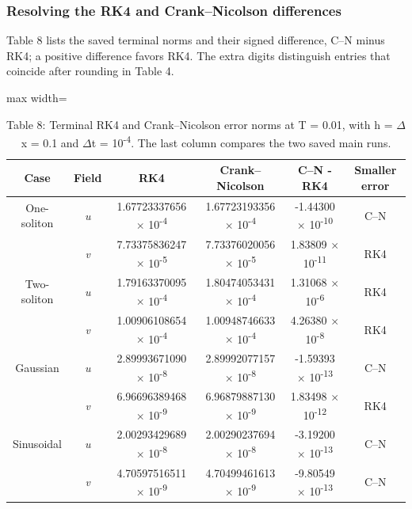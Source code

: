 \documentclass{article}
\theoremstyle{plain}
\theoremstyle{definition}
\begin{document}
\subsubsection*{Resolving the RK4 and Crank–Nicolson differences}

Table 8 lists the saved terminal norms and their signed difference, C–N minus RK4; a positive difference favors RK4. The extra digits distinguish entries that coincide after rounding in Table 4.

\begin{table}[H]
\centering
\caption*{Table 8: Terminal RK4 and Crank–Nicolson error norms at T = 0.01, with h = \(\Delta\)x = 0.1 and \(\Delta\)t = 10\textsuperscript{-}\textsuperscript{4}. The last column compares the two saved main runs.}
\normalsize
\setlength{\tabcolsep}{6pt}
\renewcommand{\arraystretch}{1.25}\setlength{\extrarowheight}{1pt}
\begin{adjustbox}{max width=\linewidth}
\begin{tabular}{cccccc}
\hline
\multicolumn{1}{c}{Case} & \multicolumn{1}{c}{Field} & \multicolumn{1}{c}{RK4} & \multicolumn{1}{c}{Crank–Nicolson} & \multicolumn{1}{c}{C–N - RK4} & \multicolumn{1}{c}{Smaller error} \\
\hline
One-soliton & \textit{u} & 1.67723337656 \(\times\) 10\textsuperscript{-4} & 1.67723193356 \(\times\) 10\textsuperscript{-4} & -1.44300 \(\times\) 10\textsuperscript{-10} & C–N \\
 & \textit{v} & 7.73375836247 \(\times\) 10\textsuperscript{-5} & 7.73376020056 \(\times\) 10\textsuperscript{-5} & 1.83809 \(\times\) 10\textsuperscript{-11} & RK4 \\
Two-soliton & \textit{u} & 1.79163370095 \(\times\) 10\textsuperscript{-4} & 1.80474053431 \(\times\) 10\textsuperscript{-4} & 1.31068 \(\times\) 10\textsuperscript{-6} & RK4 \\
 & \textit{v} & 1.00906108654 \(\times\) 10\textsuperscript{-4} & 1.00948746633 \(\times\) 10\textsuperscript{-4} & 4.26380 \(\times\) 10\textsuperscript{-8} & RK4 \\
Gaussian & \textit{u} & 2.89993671090 \(\times\) 10\textsuperscript{-8} & 2.89992077157 \(\times\) 10\textsuperscript{-8} & -1.59393 \(\times\) 10\textsuperscript{-13} & C–N \\
 & \textit{v} & 6.96696389468 \(\times\) 10\textsuperscript{-9} & 6.96879887130 \(\times\) 10\textsuperscript{-9} & 1.83498 \(\times\) 10\textsuperscript{-12} & RK4 \\
Sinusoidal & \textit{u} & 2.00293429689 \(\times\) 10\textsuperscript{-8} & 2.00290237694 \(\times\) 10\textsuperscript{-8} & -3.19200 \(\times\) 10\textsuperscript{-13} & C–N \\
 & \textit{v} & 4.70597516511 \(\times\) 10\textsuperscript{-9} & 4.70499461613 \(\times\) 10\textsuperscript{-9} & -9.80549 \(\times\) 10\textsuperscript{-13} & C–N \\
\hline
\end{tabular}
\end{adjustbox}
\end{table}
\end{document}
